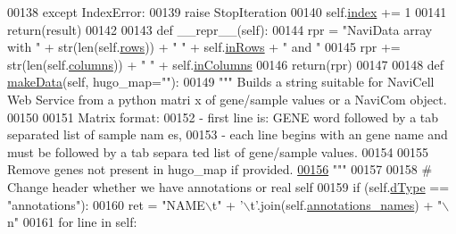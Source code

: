 \begin{DoxyCode}
00138         \textcolor{keywordflow}{except} IndexError:
00139             \textcolor{keywordflow}{raise} StopIteration
00140         self.\hyperlink{classnavicom_1_1navidata_1_1NaviData_adb2e7ce6c9a691a186d91d4a8d49864a}{index} += 1
00141         \textcolor{keywordflow}{return}(result)
00142 
00143     \textcolor{keyword}{def }\_\_repr\_\_(self):
00144         rpr = \textcolor{stringliteral}{"NaviData array with "} + str(len(self.\hyperlink{classnavicom_1_1navidata_1_1NaviData_a3aabc82d01a697d1c22e82f171438399}{rows})) + \textcolor{stringliteral}{" "} + self.\hyperlink{classnavicom_1_1navidata_1_1NaviData_a172b33d53b897135381a92b045f5576b}{inRows} + 
      \textcolor{stringliteral}{" and "}
00145         rpr += str(len(self.\hyperlink{classnavicom_1_1navidata_1_1NaviData_a16de6799b97fad281e7e4e954b9e4de5}{columns})) + \textcolor{stringliteral}{" "} + self.\hyperlink{classnavicom_1_1navidata_1_1NaviData_a080320f0715d257f61490985484e6d54}{inColumns}
00146         \textcolor{keywordflow}{return}(rpr)
00147 
00148     \textcolor{keyword}{def }\hyperlink{classnavicom_1_1navidata_1_1NaviData_a0ad79f0fbf4ab86ca13255069bf98632}{makeData}(self, hugo\_map=""):
00149         \textcolor{stringliteral}{""" Builds a string suitable for NaviCell Web Service from a python matri
      x of gene/sample values or a NaviCom object.}
00150 \textcolor{stringliteral}{}
00151 \textcolor{stringliteral}{        Matrix format:}
00152 \textcolor{stringliteral}{        - first line is: GENE word followed by a tab separated list of sample nam
      es,}
00153 \textcolor{stringliteral}{        - each line begins with an gene name and must be followed by a tab separa
      ted list of gene/sample values.}
00154 \textcolor{stringliteral}{}
00155 \textcolor{stringliteral}{        Remove genes not present in hugo\_map if provided.}
\hypertarget{navidata_8py_source_l00156}{}\hyperlink{classnavicom_1_1navidata_1_1NaviData_a0ad79f0fbf4ab86ca13255069bf98632}{00156} \textcolor{stringliteral}{        """}
00157 
00158         \textcolor{comment}{# Change header whether we have annotations or real self}
00159         \textcolor{keywordflow}{if} (self.\hyperlink{classnavicom_1_1navidata_1_1NaviData_a89cf0727f26dba8aabb38271d85b169d}{dType} == \textcolor{stringliteral}{"annotations"}):
00160             ret = \textcolor{stringliteral}{"NAME\(\backslash\)t"} + \textcolor{stringliteral}{'\(\backslash\)t'}.join(self.\hyperlink{classnavicom_1_1navidata_1_1NaviData_aae9bfcdefa67abad304df58b7e4a62c8}{annotations_names}) + \textcolor{stringliteral}{"\(\backslash\)n"}
00161             \textcolor{keywordflow}{for} line \textcolor{keywordflow}{in} self:

\end{DoxyCode}
